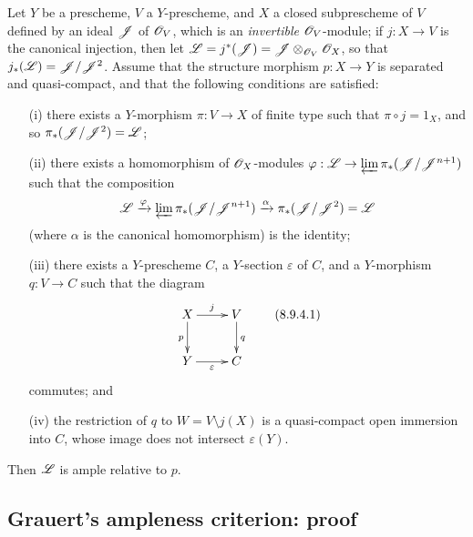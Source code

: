 \begin{proposition}[8.9.4]
\label{II.8.9.4}
Let $Y$ be a prescheme, $V$ a $Y$-prescheme, and $X$ a closed subprescheme of $V$ defined by an ideal $\mathscr{J}$ of $\mathscr{O}_V$, which is an \emph{invertible} $\mathscr{O}_V$-module;
if $j:X\to V$ is
the canonical injection, then let $\mathscr{L} = j^*(\mathscr{J}) = \mathscr{J}\otimes_{\mathscr{O}_V}\mathscr{O}_X$, so that $j_*(\mathscr{L})=\mathscr{J}/\mathscr{J}^2$.
Assume that the structure morphism $p:X\to Y$ is separated and quasi-compact, and that the following conditions are satisfied:
\begin{enumerate}
  \item[\rm{(i)}] there exists a $Y$-morphism $\pi:V\to X$ of finite type such that $\pi\circ j=1_X$, and so $\pi_*(\mathscr{J}/\mathscr{J}^2)=\mathscr{L}$;
  \item[\rm{(ii)}] there exists a homomorphism of $\mathscr{O}_X$-modules $\varphi:\sh{L}\to\varprojlim\pi_*(\sh{J}/\sh{J}^{n+1})$ such that the composition
    \[
      \mathscr{L}
      \xrightarrow{\varphi}
      \varprojlim \pi_*(\mathscr{J}/\mathscr{J}^{n+1})
      \xrightarrow{\alpha}
      \pi_*(\mathscr{J}/\mathscr{J}^2) = \mathscr{L}
    \]
    (where $\alpha$ is the canonical homomorphism) is the identity;
  \item[\rm{(iii)}] there exists a $Y$-prescheme $C$, a $Y$-section $\varepsilon$ of $C$, and a $Y$-morphism $q:V\to C$ such that the diagram
    \[
    \label{II.8.9.4.1}
      \xymatrix{
        X
          \ar[r]^{j}
          \ar[d]_{p}
      & V
          \ar[d]^{q}
      \\Y
          \ar[r]_{\varepsilon}
      & C
      }
    \tag{8.9.4.1}
    \]
    commutes; and
  \item[\rm{(iv)}] the restriction of $q$ to $W=V\setminus j(X)$ is a quasi-compact open immersion into $C$, whose image does not intersect $\varepsilon(Y)$.
\end{enumerate}
Then $\mathscr{L}$ is ample relative to $p$.
\end{proposition}


\subsection{Grauert's ampleness criterion: proof}
\label{subsection:II.8.10}

\begin{lemma}[8.10.1]
\label{II.8.10.1}
\end{lemma}




